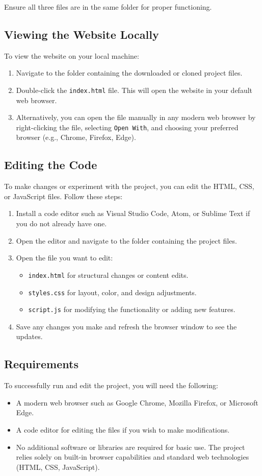 \documentclass[11pt,twocolumn]{article}
\begin{document}
Ensure all three files are in the same folder for proper functioning.

\subsection{Viewing the Website Locally}
To view the website on your local machine:
\begin{enumerate}
    \item Navigate to the folder containing the downloaded or cloned project files.
    \item Double-click the \texttt{index.html} file. This will open the website in your default web browser.
    \item Alternatively, you can open the file manually in any modern web browser by right-clicking the file, selecting \texttt{Open With}, and choosing your preferred browser (e.g., Chrome, Firefox, Edge).
\end{enumerate}

\subsection{Editing the Code}
To make changes or experiment with the project, you can edit the HTML, CSS, or JavaScript files. Follow these steps:
\begin{enumerate}
    \item Install a code editor such as Visual Studio Code, Atom, or Sublime Text if you do not already have one.
    \item Open the editor and navigate to the folder containing the project files.
    \item Open the file you want to edit:
        \begin{itemize}
            \item \texttt{index.html} for structural changes or content edits.
            \item \texttt{styles.css} for layout, color, and design adjustments.
            \item \texttt{script.js} for modifying the functionality or adding new features.
        \end{itemize}
    \item Save any changes you make and refresh the browser window to see the updates.
\end{enumerate}

\subsection{Requirements}
To successfully run and edit the project, you will need the following:
\begin{itemize}
    \item A modern web browser such as Google Chrome, Mozilla Firefox, or Microsoft Edge.
    \item A code editor for editing the files if you wish to make modifications.
    \item No additional software or libraries are required for basic use. The project relies solely on built-in browser capabilities and standard web technologies (HTML, CSS, JavaScript).
\end{itemize}
\end{document}
